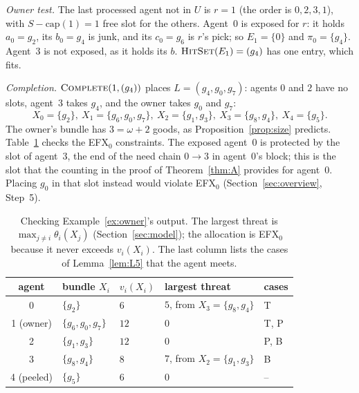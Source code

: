 \documentclass[runningheads,11pt]{llncs}
\newcommand{\efxz}{\texorpdfstring{\mbox{EFX$_0$}}{EFX0}}
\newcommand{\capa}{\mathrm{cap}}
\newcommand{\HitSet}{\textup{\textsc{HitSet}}}
\newcommand{\Complete}{\textup{\textsc{Complete}}}
\begin{document}
\begin{example}[owner $r$]
\emph{Owner test.} The last processed agent not in $U$ is $r=1$ (the order is $0,2,3,1$), with $S-\capa(1)=1$ free slot for the others. Agent~$0$ is exposed for $r$: it holds $a_0=g_2$, its $b_0=g_4$ is junk, and its $c_0=g_6$ is $r$'s pick; so $E_1=\{0\}$ and $\pi_0=\{g_4\}$. Agent~$3$ is not exposed, as it holds its $b$. $\HitSet(E_1)=(g_4)$ has one entry, which fits.

\emph{Completion.} $\Complete(1,(g_4))$ places $L=(g_4,g_0,g_7)$: agents $0$ and $2$ have no slots, agent~$3$ takes $g_4$, and the owner takes $g_0$ and $g_7$:
\[
X_0=\{g_2\},\ X_1=\{g_6,g_0,g_7\},\ X_2=\{g_1,g_3\},\ X_3=\{g_8,g_4\},\ X_4=\{g_5\}.
\]
The owner's bundle has $3=\omega+2$ goods, as Proposition~\ref{prop:size} predicts. Table~\ref{tab:ex1check} checks the \efxz{} constraints. The exposed agent~$0$ is protected by the slot of agent~$3$, the end of the need chain $0\to3$ in agent~$0$'s block; this is the slot that the counting in the proof of Theorem~\ref{thm:A} provides for agent~$0$. Placing $g_0$ in that slot instead would violate \efxz{} (Section~\ref{sec:overview}, Step~5).
\end{example}

\begin{table}[tbp]
\caption{Checking Example~\ref{ex:owner}'s output. The largest threat is $\max_{j\ne i}\theta_i(X_j)$ (Section~\ref{sec:model}); the allocation is \efxz{} because it never exceeds $v_i(X_i)$. The last column lists the cases of Lemma~\ref{lem:L5} that the agent meets.}\label{tab:ex1check}
\centering\small
\setlength{\tabcolsep}{4pt}\begin{tabular}{@{}cllll@{}}
\toprule
agent & bundle $X_i$ & $v_i(X_i)$ & largest threat & cases \\
\midrule
0 & $\{g_2\}$ & $6$ & $5$, from $X_3=\{g_8,g_4\}$ & T \\
1 (owner) & $\{g_6,g_0,g_7\}$ & $12$ & $0$ & T, P \\
2 & $\{g_1,g_3\}$ & $12$ & $0$ & P, B \\
3 & $\{g_8,g_4\}$ & $8$ & $7$, from $X_2=\{g_1,g_3\}$ & B \\
4 (peeled) & $\{g_5\}$ & $6$ & $0$ & -- \\
\bottomrule
\end{tabular}
\end{table}
\end{document}
